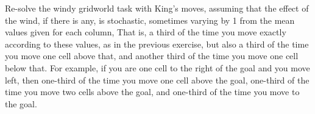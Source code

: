 
\begin{exercise}

Re-solve the windy gridworld task with King's moves, assuming that the effect
of the wind, if there is any, is stochastic, sometimes varying by 1 from the
mean values given for each column, That is, a third of the time you move
exactly according to these values, as in the previous exercise, but also a
third of the time you move one cell above that, and another third of the
time you move one cell below that. For example, if you are one cell
to the right of the goal and you move left, then one-third of the time
you move one cell above the goal, one-third of the time you move two cells
above the goal, and one-third of the time you move to the goal.

\end{exercise}


\begin{solution}

\phantom{}

\end{solution}

